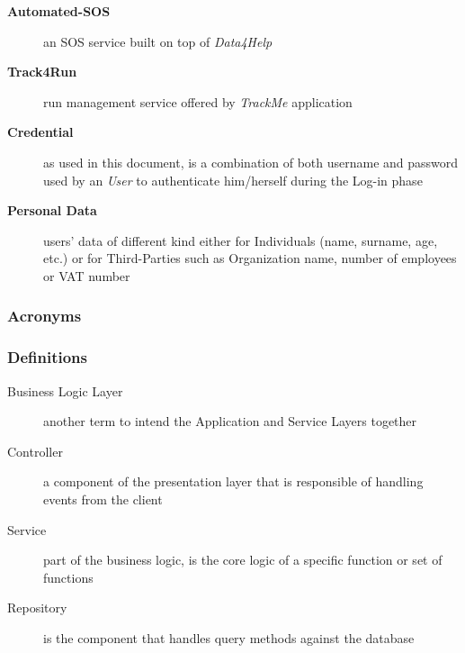 \documentclass[a4paper]{article}
\begin{document}
\begin{description}
                    \item[\textbf{Automated-SOS}] an SOS service built on top of \textit{Data4Help}
                    
                    \item[\textbf{Track4Run}] run management service offered by \textit{TrackMe} application
                    
                    \item[\textbf{Credential}] as used in this document, is a combination of both username and password used by an \textit{User} to authenticate him/herself during the Log-in phase
                    
                    \item[\textbf{Personal Data}] users' data of different kind either for Individuals (name, surname, age, etc.) or for Third-Parties such as Organization name, number of employees or VAT number
                \end{description}
            
            \subsubsection{Acronyms}
            \begin{acronym}
            \end{acronym}
            
            \subsubsection{Definitions}
            \begin{description}
                 \item[Business Logic Layer] another term to intend the Application and Service Layers together
                 \item[Controller] a component of the presentation layer that is responsible of handling events from the client
                 \item[Service] part of the business logic, is the core logic of a specific function or set of functions
                 \item[Repository] is the component that handles query methods against the database
            \end{description}
            
\end{document}
